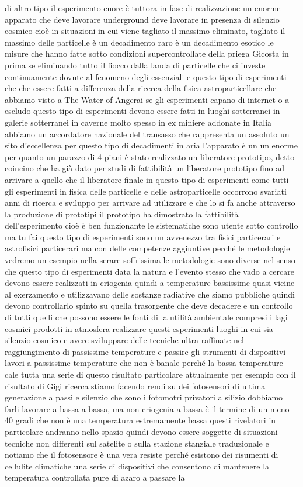 di altro tipo il esperimento cuore è tuttora in fase di realizzazione un enorme apparato che deve lavorare underground deve lavorare in presenza di silenzio cosmico cioè in situazioni in cui viene tagliato il massimo eliminato, tagliato il massimo delle particelle è un decadimento raro è un decadimento esotico le misure che hanno fatte sotto condizioni supercontrollate della priega Gicosta in prima se eliminando tutto il fiocco dalla landa di particelle che ci investe continuamente dovute al fenomeno degli essenziali e questo tipo di esperimenti che che essere fatti a differenza della ricerca della fisica astroparticellare che abbiamo visto a The Water of Angerai se gli esperimenti capano di internet o a escludo questo tipo di esperimenti devono essere fatti in luoghi sotterranei in galerie sotterranei in caverne molto spesso in ex miniere addonate in Italia abbiamo un accordatore nazionale del transasso che rappresenta un assoluto un sito d'eccellenza per questo tipo di decadimenti in aria l'apparato è un un enorme per quanto un parazzo di 4 piani è stato realizzato un liberatore prototipo, detto coincino che ha già dato per studi di fattibilità un liberatore prototipo fino ad arrivare a quello che il liberatore finale in questo tipo di esperimenti come tutti gli esperimenti in fisica delle particelle e delle astroparticelle occorrono svariati anni di ricerca e sviluppo per arrivare ad utilizzare e che lo si fa anche attraverso la produzione di prototipi il prototipo ha dimostrato la fattibilità dell'esperimento cioè è ben funzionante le sistematiche sono utente sotto controllo ma tu fai questo tipo di esperimenti sono un avvenezzo tra fisici particerari e astrofisici particerari ma con delle competenze aggiuntive perché le metodologie vedremo un esempio nella serare soffrissima le metodologie sono diverse nel senso che questo tipo di esperimenti data la natura e l'evento stesso che vado a cercare devono essere realizzati in criogenia quindi a temperature bassissime quasi vicine al exerzamento e utilizzavano delle sostanze radiative che siamo pubbliche quindi devono controllarlo spinto su quella trasorgente che deve decadere e un controllo di tutti quelli che possono essere le fonti di la utilità ambientale compresi i lagi cosmici prodotti in atmosfera realizzare questi esperimenti luoghi in cui sia silenzio cosmico e avere sviluppare delle tecniche ultra raffinate nel raggiungimento di passissime temperature e passire gli strumenti di dispositivi lavori a passissime temperature che non è banale perché la bassa temperature cale tutta una serie di questo risultato particolare attualmente per esempio con il risultato di Gigi ricerca stiamo facendo rendi su dei fotosensori di ultima generazione a passi e silenzio che sono i fotomotri privatori a silizio dobbiamo farli lavorare a bassa a bassa, ma non criogenia a bassa è il termine di un meno 40 gradi che non è una temperatura estremamente bassa questi rivelatori in particolare andranno nello spazio quindi devono essere soggette di situazioni tecniche non differenti sul satelite o sulla stazione stanziale traduzionale e notiamo che il fotosensore è una vera resiste perché esistono dei risumenti di cellulite climatiche una serie di dispositivi che consentono di mantenere la temperatura controllata pure di azaro a passare la 